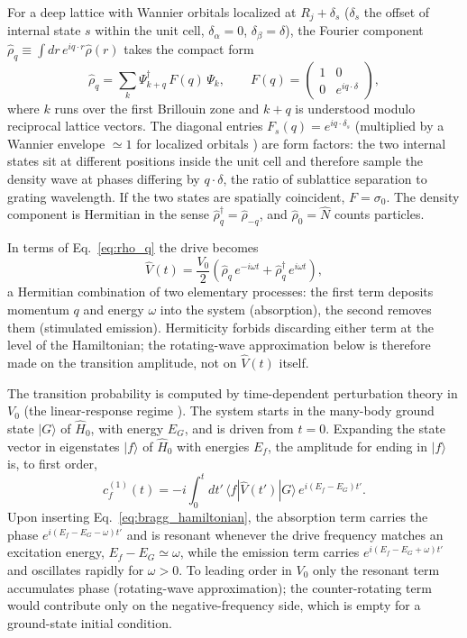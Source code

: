 \documentclass[onecolumn,aps,prl,superscriptaddress,longbibliography]{revtex4-2}
\begin{document}
For a deep lattice with Wannier orbitals localized at $R_j+\delta_s$ ($\delta_s$ the offset of internal state $s$ within the unit cell, $\delta_\alpha=0$, $\delta_\beta=\delta$), the Fourier component $\hat\rho_q\equiv\int dr\,e^{iq\cdot r}\hat\rho(r)$ takes the compact form
\begin{equation}\label{eq:rho_q}
  \hat\rho_q = \sum_k \Psi_{k+q}^\dagger\,F(q)\,\Psi_k,
  \qquad
  F(q) = \begin{pmatrix} 1 & 0 \\ 0 & e^{iq\cdot\delta} \end{pmatrix},
\end{equation}
where $k$ runs over the first Brillouin zone and $k+q$ is understood modulo reciprocal lattice vectors. The diagonal entries $F_s(q)=e^{iq\cdot\delta_s}$ (multiplied by a Wannier envelope $\simeq1$ for localized orbitals \cite{rey2005}) are form factors: the two internal states sit at different positions inside the unit cell and therefore sample the density wave at phases differing by $q\cdot\delta$, the ratio of sublattice separation to grating wavelength. If the two states are spatially coincident, $F=\sigma_0$. The density component is Hermitian in the sense $\hat\rho_q^\dagger=\hat\rho_{-q}$, and $\hat\rho_0=\hat N$ counts particles.

In terms of Eq.~\eqref{eq:rho_q} the drive becomes
\begin{equation}\label{eq:bragg_hamiltonian}
  \hat V(t) = \frac{V_0}{2}\left(\hat\rho_q\,e^{-i\omega t} + \hat\rho_q^\dagger\,e^{i\omega t}\right),
\end{equation}
a Hermitian combination of two elementary processes: the first term deposits momentum $q$ and energy $\omega$ into the system (absorption), the second removes them (stimulated emission). Hermiticity forbids discarding either term at the level of the Hamiltonian; the rotating-wave approximation below is therefore made on the transition amplitude, not on $\hat V(t)$ itself.

The transition probability is computed by time-dependent perturbation theory in $V_0$ (the linear-response regime \cite{rey2005,bruusFlensberg2016}). The system starts in the many-body ground state $|G\rangle$ of $\hat H_0$, with energy $E_G$, and is driven from $t=0$. Expanding the state vector in eigenstates $|f\rangle$ of $\hat H_0$ with energies $E_f$, the amplitude for ending in $|f\rangle$ is, to first order,
\begin{equation}\label{eq:bragg_amplitude}
  c_f^{(1)}(t) = -i\int_0^t dt'\,\langle f|\hat V(t')|G\rangle\,e^{i(E_f-E_G)t'}.
\end{equation}
Upon inserting Eq.~\eqref{eq:bragg_hamiltonian}, the absorption term carries the phase $e^{i(E_f-E_G-\omega)t'}$ and is resonant whenever the drive frequency matches an excitation energy, $E_f-E_G\simeq\omega$, while the emission term carries $e^{i(E_f-E_G+\omega)t'}$ and oscillates rapidly for $\omega>0$. To leading order in $V_0$ only the resonant term accumulates phase (rotating-wave approximation); the counter-rotating term would contribute only on the negative-frequency side, which is empty for a ground-state initial condition.
\end{document}
